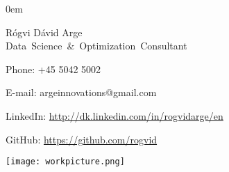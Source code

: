 \documentclass[10pt,a4paper]{article}
\begin{document}
\parindent0em
\begin{minipage}[t]{0.5\linewidth}
\vspace{-3.85cm}
{\Huge \textcolor{myblue}{Rógvi Dávid Arge} }\\

{\Large \mbox{Data Science \& Optimization Consultant}}
\vspace{0.3cm}

Phone: +45 5042 5002

\vspace{0.1cm}
E-mail: argeinnovations@gmail.com

\vspace{0.1cm}
LinkedIn: \url{http://dk.linkedin.com/in/rogvidarge/en}

\vspace{0.1cm}
GitHub: \url{https://github.com/rogvid} \\
\vspace{-1.6cm}
\end{minipage}\hspace{0.1cm}
\hfill\begin{minipage}[t]{0.3\linewidth}\raggedleft
    \texttt{[image: workpicture.png]}
\end{minipage}
\end{document}
